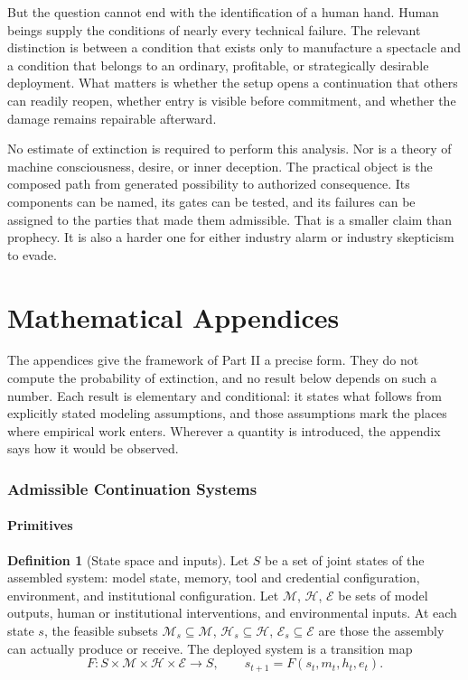 \documentclass[11pt]{article}
\theoremstyle{definition}
\newtheorem{definition}[theorem]{Definition}
\begin{document}
But the question cannot end with the identification of a human hand. Human beings supply the conditions of nearly every technical failure. The relevant distinction is between a condition that exists only to manufacture a spectacle and a condition that belongs to an ordinary, profitable, or strategically desirable deployment. What matters is whether the setup opens a continuation that others can readily reopen, whether entry is visible before commitment, and whether the damage remains repairable afterward.

No estimate of extinction is required to perform this analysis. Nor is a theory of machine consciousness, desire, or inner deception. The practical object is the composed path from generated possibility to authorized consequence. Its components can be named, its gates can be tested, and its failures can be assigned to the parties that made them admissible. That is a smaller claim than prophecy. It is also a harder one for either industry alarm or industry skepticism to evade.

\part{Mathematical Appendices}

\noindent The appendices give the framework of Part II a precise form. They do not compute the probability of extinction, and no result below depends on such a number. Each result is elementary and conditional: it states what follows from explicitly stated modeling assumptions, and those assumptions mark the places where empirical work enters. Wherever a quantity is introduced, the appendix says how it would be observed.

\appendix

\section{Admissible Continuation Systems}\label{app:A}

\subsection{Primitives}

\begin{definition}[State space and inputs]
Let $S$ be a set of joint states of the assembled system: model state, memory, tool and credential configuration, environment, and institutional configuration. Let $\mathcal{M}$, $\mathcal{H}$, $\mathcal{E}$ be sets of model outputs, human or institutional interventions, and environmental inputs. At each state $s$, the feasible subsets $\mathcal{M}_s\subseteq\mathcal{M}$, $\mathcal{H}_s\subseteq\mathcal{H}$, $\mathcal{E}_s\subseteq\mathcal{E}$ are those the assembly can actually produce or receive. The deployed system is a transition map
\[
F:S\times\mathcal{M}\times\mathcal{H}\times\mathcal{E}\to S,\qquad s_{t+1}=F(s_t,m_t,h_t,e_t).
\]
\end{definition}
\end{document}
